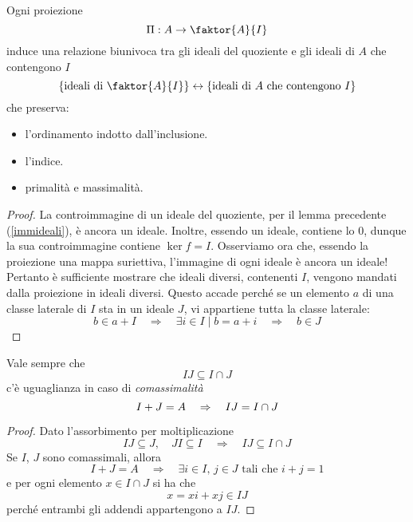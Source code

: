 \begin{multicols}{2}
\begin{theorem}[di corrispondenza]\label{corr}
	Ogni proiezione $$  \Pi : A \to \faktor{A}{I}  $$ induce una relazione biunivoca tra gli ideali del quoziente e gli ideali di $ A $ che contengono $ I $
	\[ \{ \text{ideali di }\faktor{A}{I} \} \leftrightarrow \{ \text{ideali di $ A $ che contengono $ I $} \} \]
	che preserva:
	\begin{itemize}
		\item l'ordinamento indotto dall'inclusione.
		\item l'indice.
		\item primalità e massimalità.
	\end{itemize}
\end{theorem}
\begin{proof}
	La controimmagine di un ideale del quoziente, per il lemma precedente (\ref{immideali}), è ancora un ideale.
	Inoltre, essendo un ideale, contiene lo $ 0 $, dunque la sua controimmagine contiene $ \ker f = I $. Osserviamo ora che, essendo la proiezione una mappa suriettiva, l'immagine di ogni ideale è ancora un ideale! Pertanto è sufficiente mostrare che ideali diversi, contenenti $ I $, vengono mandati dalla proiezione in ideali diversi. Questo accade perché se un elemento $ a $ di una classe laterale di $ I $ sta in un ideale $ J $, vi appartiene tutta la classe laterale:
	\[ b \in a + I \quad\Rightarrow\quad \exists i \in I \mid b = a + i \quad\Rightarrow\quad b \in J \]
\end{proof}
\begin{remark}
	Vale sempre che
	\[ IJ \subseteq I \cap J \]
	c'è uguaglianza in caso di \emph{comassimalità}
	\[ I + J = A \quad\Rightarrow\quad IJ = I \cap J \]
\end{remark}
\begin{proof}
	Dato l'assorbimento per moltiplicazione
	\[ IJ \subseteq J, \quad JI \subseteq I \quad\Rightarrow\quad IJ \subseteq I \cap J  \]
	Se $ I $, $ J $ sono comassimali, allora
	\[ I + J = A \quad\Rightarrow\quad \exists i \in I, \, j \in J \text{ tali che } i + j = 1 \]
	e per ogni elemento $ x \in I \cap J $ si ha che
	\[ x = xi + xj \in IJ \]
	perché entrambi gli addendi appartengono a $ IJ $.
\end{proof}


\end{multicols}
